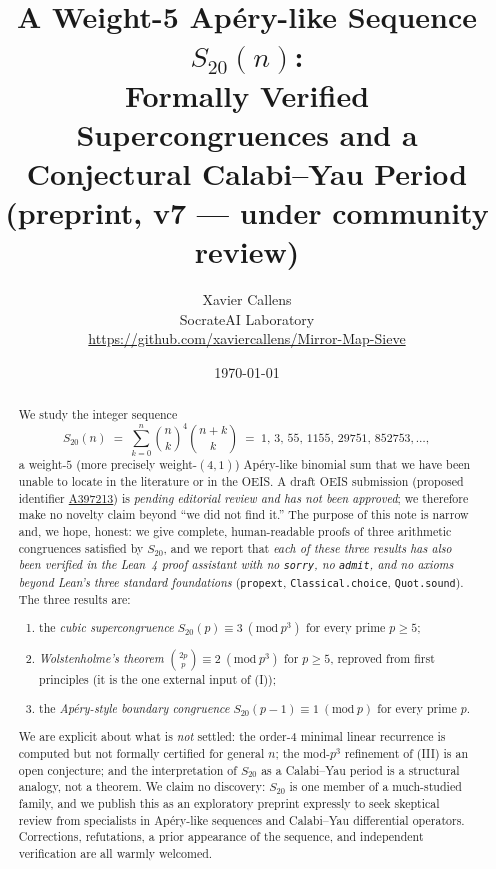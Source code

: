 \documentclass[11pt,a4paper]{article}
\title{A Weight-5 Ap\'ery-like Sequence $S_{20}(n)$:\\
  Formally Verified Supercongruences and a Conjectural Calabi--Yau Period\\
  \large (preprint, v7 --- under community review)}
\author{Xavier Callens\\
  SocrateAI Laboratory\\
  \url{https://github.com/xaviercallens/Mirror-Map-Sieve}}
\date{\today}
\theoremstyle{definition}
\theoremstyle{remark}
\newcommand{\Sx}{S_{20}}
\newcommand{\modp}[1]{\ (\mathrm{mod}\ #1)}
\begin{document}
\maketitle

\begin{abstract}
We study the integer sequence
\[
  \Sx(n) \;=\; \sum_{k=0}^{n} \binom{n}{k}^{4}\binom{n+k}{k}
  \;=\; 1,\,3,\,55,\,1155,\,29751,\,852753,\dots,
\]
a weight-$5$ (more precisely weight-$(4,1)$) Ap\'ery-like binomial sum that we
have been unable to locate in the literature or in the OEIS.  A draft OEIS
submission (proposed identifier
\href{https://oeis.org/draft/A397213}{A397213}) is \emph{pending editorial
review and has not been approved}; we therefore make no novelty claim beyond
``we did not find it.''  The purpose of this note is narrow and, we hope,
honest: we give complete, human-readable proofs of three arithmetic congruences
satisfied by $\Sx$, and we report that \emph{each of these three results has
also been verified in the Lean~4 proof assistant with no \texttt{sorry}, no
\texttt{admit}, and no axioms beyond Lean's three standard foundations}
(\texttt{propext}, \texttt{Classical.choice}, \texttt{Quot.sound}).  The three
results are:
\begin{enumerate}\itemsep0pt
  \item[(I)] the \emph{cubic supercongruence} $\Sx(p)\equiv 3 \modp{p^{3}}$ for
        every prime $p\ge 5$;
  \item[(II)] \emph{Wolstenholme's theorem} $\binom{2p}{p}\equiv 2 \modp{p^{3}}$
        for $p\ge 5$, reproved from first principles (it is the one external
        input of (I));
  \item[(III)] the \emph{Ap\'ery-style boundary congruence}
        $\Sx(p-1)\equiv 1 \modp{p}$ for every prime $p$.
\end{enumerate}
We are explicit about what is \emph{not} settled: the order-$4$ minimal linear
recurrence is computed but not formally certified for general $n$; the mod-$p^3$
refinement of (III) is an open conjecture; and the interpretation of $\Sx$ as a
Calabi--Yau period is a structural analogy, not a theorem.  We claim no
discovery: $\Sx$ is one member of a much-studied family, and we publish this as
an exploratory preprint expressly to seek skeptical review from specialists in
Ap\'ery-like sequences and Calabi--Yau differential operators.  Corrections,
refutations, a prior appearance of the sequence, and independent verification
are all warmly welcomed.
\end{abstract}
\end{document}
